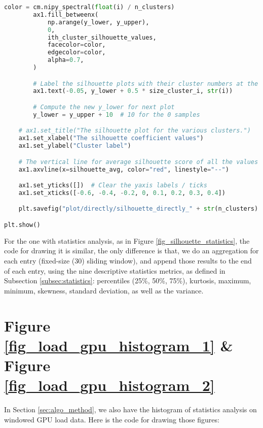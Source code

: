 \begin{lstlisting}[language=Python]
        color = cm.nipy_spectral(float(i) / n_clusters)
        ax1.fill_betweenx(
            np.arange(y_lower, y_upper),
            0,
            ith_cluster_silhouette_values,
            facecolor=color,
            edgecolor=color,
            alpha=0.7,
        )

        # Label the silhouette plots with their cluster numbers at the middle
        ax1.text(-0.05, y_lower + 0.5 * size_cluster_i, str(i))

        # Compute the new y_lower for next plot
        y_lower = y_upper + 10  # 10 for the 0 samples

    # ax1.set_title("The silhouette plot for the various clusters.")
    ax1.set_xlabel("The silhouette coefficient values")
    ax1.set_ylabel("Cluster label")

    # The vertical line for average silhouette score of all the values
    ax1.axvline(x=silhouette_avg, color="red", linestyle="--")

    ax1.set_yticks([])  # Clear the yaxis labels / ticks
    ax1.set_xticks([-0.6, -0.4, -0.2, 0, 0.1, 0.2, 0.3, 0.4])

    plt.savefig("plot/directly/silhouette_directly_" + str(n_clusters) + ".pdf", format="pdf", bbox_inches="tight")

plt.show()
\end{lstlisting}

For the one with statistics analysis, as in Figure \ref{fig_silhouette_statistics}, the code for drawing it is similar, the only difference is that, we do an aggregation for each entry (fixed-size (30) sliding window), and append those results to the end of each entry, using the nine descriptive statistics metrics, as defined in Subsection \ref{subsec:statistics}: percentiles (25\%, 50\%, 75\%), kurtosis, maximum, minimum, skewness, standard deviation, as well as the variance.

\clearpage

\section{Figure \ref{fig_load_gpu_histogram_1} \& Figure \ref{fig_load_gpu_histogram_2}}
In Section \ref{sec:algo_method}, we also have the histogram of statistics analysis on windowed GPU load data. Here is the code for drawing those figures:

